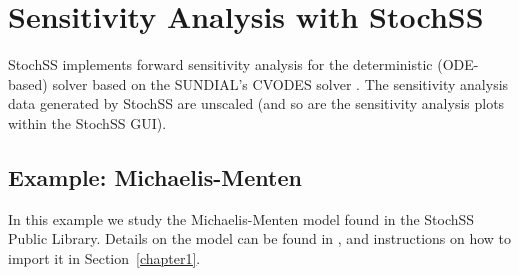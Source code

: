 \chapter{Sensitivity Analysis with StochSS}

%

StochSS implements forward sensitivity analysis for the deterministic (ODE-based) solver based on the SUNDIAL's CVODES solver \cite{sundials}. The sensitivity analysis data generated by StochSS are unscaled (and so are the sensitivity analysis plots within the StochSS GUI).

\section{Example: Michaelis-Menten}

In this example we study the Michaelis-Menten model found in the StochSS Public Library. Details on the model can be found in \cite{wiki-michaelis-menten}, and instructions on how to import it in Section~\ref{chapter1}. 

